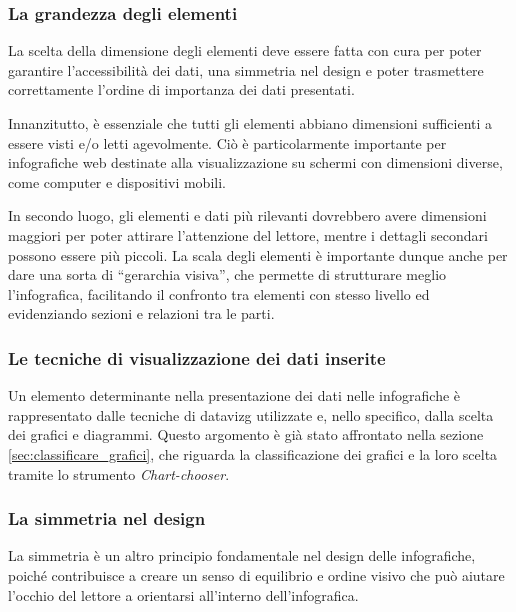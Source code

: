 \subsubsection{La grandezza degli elementi}
La scelta della dimensione degli elementi deve essere fatta con cura per poter garantire l'accessibilità dei dati, una simmetria nel design e poter trasmettere correttamente l'ordine di importanza 
dei dati presentati.

Innanzitutto, è essenziale che tutti gli elementi abbiano dimensioni sufficienti a essere visti e/o letti agevolmente. Ciò è particolarmente importante per infografiche web destinate alla visualizzazione su schermi con
dimensioni diverse, come computer e dispositivi mobili.

In secondo luogo, gli elementi e dati più rilevanti dovrebbero avere dimensioni maggiori per poter attirare l'attenzione del lettore, mentre i dettagli secondari possono essere più piccoli.
La scala degli elementi è importante dunque anche per dare una sorta di ``gerarchia visiva'', che permette di strutturare meglio l'infografica, facilitando il confronto tra elementi con stesso livello ed evidenziando sezioni e 
relazioni tra le parti.

\subsubsection{Le tecniche di visualizzazione dei dati inserite}
Un elemento determinante nella presentazione dei dati nelle infografiche è rappresentato dalle tecniche di \gls{datavizg} utilizzate e, nello specifico, dalla scelta dei grafici e diagrammi.
Questo argomento è già stato affrontato nella sezione \ref{sec:classificare_grafici}, che riguarda la classificazione dei grafici e la loro scelta tramite lo strumento \emph{Chart-chooser}.

\subsubsection{La simmetria nel design}
La simmetria è un altro principio fondamentale nel design delle infografiche, poiché contribuisce a creare un senso di equilibrio e ordine visivo che può aiutare l'occhio del lettore a orientarsi
all'interno dell'infografica.

